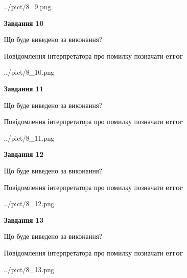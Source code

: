 \documentclass[11pt, ukrainian]{article}
\begin{document}
{\begin {large}
\begin{center}
	{../pict/8_9.png}
\end{center}
\newpage

{\begin {center}\textbf{Завдання 10}\end {center}}\par
Що буде виведено за виконання? \par
Повідомлення інтерпретатора про помилку позначати \textbf{error}

\begin{center}
	{../pict/8_10.png}
\end{center}
\newpage

{\begin {center}\textbf{Завдання 11}\end {center}}\par
Що буде виведено за виконання? \par
Повідомлення інтерпретатора про помилку позначати \textbf{error}

\begin{center}
	{../pict/8_11.png}
\end{center}
\newpage

{\begin {center}\textbf{Завдання 12}\end {center}}\par
Що буде виведено за виконання? \par
Повідомлення інтерпретатора про помилку позначати \textbf{error}

\begin{center}
	{../pict/8_12.png}
\end{center}
\newpage

{\begin {center}\textbf{Завдання 13}\end {center}}\par
Що буде виведено за виконання? \par
Повідомлення інтерпретатора про помилку позначати \textbf{error}

\begin{center}
	{../pict/8_13.png}
\end{center}
\newpage


\end{large}}
\end{document}
